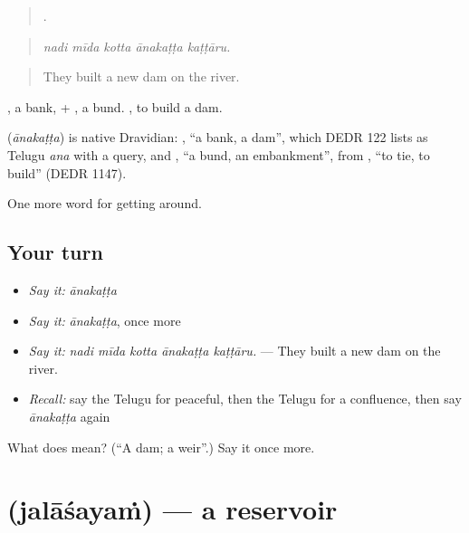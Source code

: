 \begin{quote}
    .
\end{quote}

\begin{quote}
\emph{nadi mīda kotta ānakaṭṭa kaṭṭāru.}
\end{quote}

\begin{quote}
They built a new dam on the river.
\end{quote}

, a bank, + , a bund.  , to build a dam.

\begin{cousinweb}
\textbf{} (\emph{ānakaṭṭa}) is native Dravidian: , \textquotedblleft{}a bank, a dam\textquotedblright{}, which DEDR 122 lists as Telugu \emph{ana} with a query, and , \textquotedblleft{}a bund, an embankment\textquotedblright{}, from , \textquotedblleft{}to tie, to build\textquotedblright{} (DEDR 1147).
\end{cousinweb}

\begin{grammarlens}[title={What you've built}]
One more word for getting around.
\end{grammarlens}

\subsection*{Your turn}
\begin{itemize}
\raggedright
  \item \emph{Say it:} \emph{ānakaṭṭa}
  \item \emph{Say it:} \emph{ānakaṭṭa}, once more
  \item \emph{Say it:} \emph{nadi mīda kotta ānakaṭṭa kaṭṭāru.} — They built a new dam on the river.
  \item \emph{Recall:} say the Telugu for peaceful, then the Telugu for a confluence, then say \emph{ānakaṭṭa} again
\end{itemize}

\begin{tcolorbox}[breakable,colback=teal!4,colframe=teal!35!black,title={Before you move on}]
What does  mean? (\textquotedblleft{}A dam; a weir\textquotedblright{}.) Say it once more.
\end{tcolorbox}
\section[\texorpdfstring{\te{జలాశయం} (jalāśayaṁ)}{జలాశయం (jalāśayaṁ)}]{ (jalāśayaṁ) — a reservoir}

